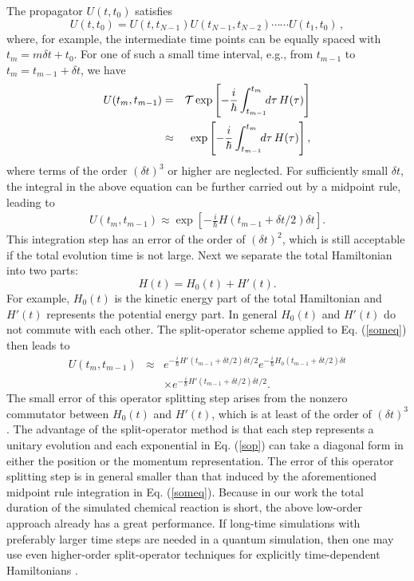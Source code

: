 \documentclass[twocolumn,showpacs,twoside,10pt,prl]{revtex4}
\newcommand{\be}{\begin{equation}}
\newcommand{\ee}{\end{equation}}
\begin{document}
The propagator $U(t,t_0)$  satisfies
\be
     U(t,t_0)=   U(t,t_{N-1})   U(t_{N-1},t_{N-2})\cdots\cdots   U(t_1,t_0)\,,
\ee
where, for example, the intermediate time points can be equally spaced with $t_m=m\delta t+t_0$.
For one of such a small time interval, e.g., from $t_{m-1}$ to $t_{m}=t_{m-1}+\delta t$, we have
\begin{eqnarray}
     U(t_{m},t_{m-1})& = &{\cal T} \exp\left[-\frac{i}{\hbar}
  \int_{t_{m-1}}^{t_m}\!\!d\tau\,   H(\tau)\right] \nonumber \\
  &\approx & \exp\left[-\frac{i}{\hbar}
  \int_{t_{m-1}}^{t_m}\!\!d\tau\,   H(\tau)\right],
\end{eqnarray}
where terms of the order $(\delta t)^3$ or higher are neglected.  For sufficiently small $\delta t$,
the integral in the above equation can be further carried out by a midpoint rule, leading to
\begin{eqnarray}
     U(t_{m},t_{m-1})\approx \exp\left[-\frac{i}{\hbar} H(t_{m-1}+\delta t/2) \delta t\right].
     \label{someq}
\end{eqnarray}
This integration step has an error of the order of $(\delta t)^2$, which is still acceptable if the total evolution time
is not large.
Next we separate the total Hamiltonian into two parts:
\be
     H(t)=   H_0(t)+   H'(t).
\ee
For example, $H_0(t)$ is the kinetic energy part of the total Hamiltonian and $H'(t)$ represents the potential energy part.  In general
$H_0(t)$ and $H'(t)$ do not commute with each other.
The split-operator scheme \cite{Feit2}  applied to Eq. (\ref{someq}) then leads to
\begin{eqnarray}
  {U}(t_m,t_{m-1}) & \approx &
   e^{-\frac{i}{\hbar}   H' (t_{m-1}+\delta t/2)    \delta t/2}
   e^{-\frac{i}{\hbar}   H_0  (t_{m-1}+\delta t/2)  \delta t  }  \nonumber \\
  & & \times  e^{-\frac{i}{\hbar}   H' (t_{m-1}+\delta t/2)             \delta t/2}.
 \label{sop}
\end{eqnarray}
The small error of this operator splitting step arises from the nonzero commutator between
$ H_0(t)$ and $H'(t)$, which is at least of the order of $(\delta t)^3$.  The advantage of
the split-operator method is that each step represents a unitary evolution and each exponential in Eq. (\ref{sop}) can take a diagonal form
in either the position or the momentum representation.
  The error of this operator splitting step
is in general smaller than that induced by the aforementioned midpoint rule integration in
Eq. (\ref{someq}). Because in our work the total duration of the
simulated chemical reaction is short, the above low-order approach already has a great performance.
If long-time simulations with preferably larger time steps are needed in a quantum simulation,
then one may use even higher-order split-operator techniques for explicitly time-dependent Hamiltonians \cite{bandrauk,zhu}.
\end{document}
